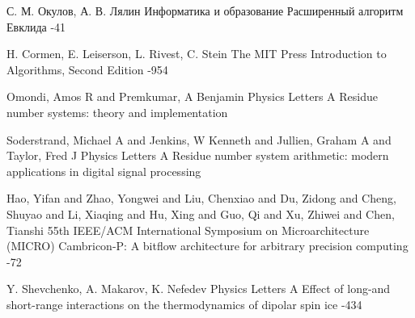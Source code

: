 \documentclass[10pt]{article}
\begin{document}
\begin{thebibliography}{20}
\setlength{\parsep}{0pt}\setlength{\itemsep}{3pt}

	\by С. М. Окулов, А. В. Лялин
	\jour Информатика и образование
	\paper Расширенный алгоритм Евклида
	-41

\by H. Cormen, E. Leiserson, L. Rivest, C. Stein
\jour The MIT Press 
\paper Introduction to Algorithms, Second Edition
-954


\by Omondi, Amos R and Premkumar, A Benjamin
\jour Physics Letters A
\paper Residue number systems: theory and implementation


\by Soderstrand, Michael A and Jenkins, W Kenneth and Jullien, Graham A and Taylor, Fred J
\jour Physics Letters A
\paper Residue number system arithmetic: modern applications in digital signal processing

\by Hao, Yifan and Zhao, Yongwei and Liu, Chenxiao and Du, Zidong and Cheng, Shuyao and Li, Xiaqing and Hu, Xing and Guo, Qi and Xu, Zhiwei and Chen, Tianshi
 55th IEEE/ACM International Symposium on Microarchitecture (MICRO)
\paper Cambricon-P: A bitflow architecture for arbitrary precision computing
-72

\by Y. Shevchenko, A. Makarov, K. Nefedev
\jour Physics Letters A
\paper Effect of long-and short-range interactions on the thermodynamics of dipolar spin ice
-434

\end{thebibliography}



\EndArticle
\end{document}
